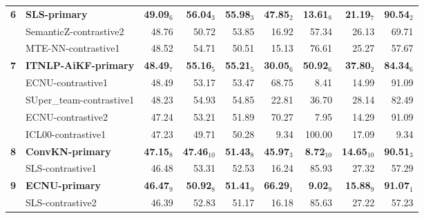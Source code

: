 \begin{table*}[tbh]
\begin{center}
\begin{tabular}{clrrrrrrr}
\bf 6 & \bf SLS-primary & \bf 49.09$_{6}$ & \bf \scriptsize 56.04$_{3}$ & \bf \scriptsize 55.98$_{3}$ & \bf \scriptsize 47.85$_{2}$ & \bf \scriptsize 13.61$_{8}$ & \bf \scriptsize 21.19$_{7}$ & \bf \scriptsize 90.54$_{2}$ \\
& SemanticZ-contrastive2 & 48.76 & \scriptsize 50.72 & \scriptsize 53.85 & \scriptsize 16.92 & \scriptsize 57.34 & \scriptsize 26.13 & \scriptsize 69.71 \\
& MTE-NN-contrastive1 & 48.52 & \scriptsize 54.71 & \scriptsize 50.51 & \scriptsize 15.13 & \scriptsize 76.61 & \scriptsize 25.27 & \scriptsize 57.67 \\
\bf 7 & \bf ITNLP­-AiKF-primary & \bf 48.49$_{7}$ & \bf \scriptsize 55.16$_{5}$ & \bf \scriptsize 55.21$_{5}$ & \bf \scriptsize 30.05$_{6}$ & \bf \scriptsize 50.92$_{6}$ & \bf \scriptsize 37.80$_{2}$ & \bf \scriptsize 84.34$_{6}$ \\
& ECNU-contrastive1 & 48.49 & \scriptsize 53.17 & \scriptsize 53.47 & \scriptsize 68.75 & \scriptsize  8.41 & \scriptsize 14.99 & \scriptsize 91.09 \\
& SUper\_team-contrastive1 & 48.23 & \scriptsize 54.93 & \scriptsize 54.85 & \scriptsize 22.81 & \scriptsize 36.70 & \scriptsize 28.14 & \scriptsize 82.49 \\
& ECNU-contrastive2 & 47.24 & \scriptsize 53.21 & \scriptsize 51.89 & \scriptsize 70.27 & \scriptsize  7.95 & \scriptsize 14.29 & \scriptsize 91.09 \\
& ICL00-contrastive1 & 47.23 & \scriptsize 49.71 & \scriptsize 50.28 & \scriptsize  9.34 & \scriptsize 100.00 & \scriptsize 17.09 & \scriptsize  9.34 \\
\bf 8 & \bf ConvKN-primary & \bf 47.15$_{8}$ & \bf \scriptsize 47.46$_{10}$ & \bf \scriptsize 51.43$_{8}$ & \bf \scriptsize 45.97$_{3}$ & \bf \scriptsize  8.72$_{10}$ & \bf \scriptsize 14.65$_{10}$ & \bf \scriptsize 90.51$_{3}$ \\
& SLS-contrastive1 & 46.48 & \scriptsize 53.31 & \scriptsize 52.53 & \scriptsize 16.24 & \scriptsize 85.93 & \scriptsize 27.32 & \scriptsize 57.29 \\
\bf 9 & \bf ECNU-primary & \bf 46.47$_{9}$ & \bf \scriptsize 50.92$_{8}$ & \bf \scriptsize 51.41$_{9}$ & \bf \scriptsize 66.29$_{1}$ & \bf \scriptsize  9.02$_{9}$ & \bf \scriptsize 15.88$_{9}$ & \bf \scriptsize 91.07$_{1}$ \\
& SLS-contrastive2 & 46.39 & \scriptsize 52.83 & \scriptsize 51.17 & \scriptsize 16.18 & \scriptsize 85.63 & \scriptsize 27.22 & \scriptsize 57.23 \\

\end{tabular}
\end{center}
\end{table*}
